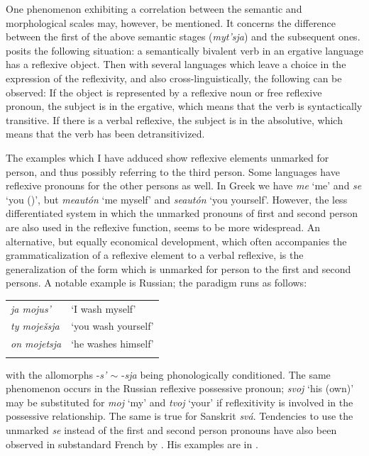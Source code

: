 One phenomenon exhibiting a correlation between the semantic and morphological scales may, however, be mentioned. It concerns the difference between the first of the above semantic stages (\textit{myt'sja}) and the subsequent ones. \citet[646f]{Edmondson1978} posits the following situation: a semantically bivalent verb in an ergative language has a reflexive object. Then with several languages which leave a choice in the expression of the reflexivity, and also cross-linguistically, the following can be observed: If the object is represented by a reflexive noun or free reflexive pronoun, the subject is in the ergative, which means that the verb is syntactically transitive. If there is a verbal reflexive, the subject is in the absolutive, which means that the verb has been detransitivized.

The examples which I have adduced show reflexive elements unmarked for person, and thus possibly referring to the third person. Some languages have reflexive pronouns for the other persons as well. In Greek we have \textit{me} ‘me’ and \textit{se} ‘you (\glacc)’, but \textit{meautón} ‘me myself’ and \textit{seautón} ‘you yourself’. However, the less differentiated system in which the unmarked pronouns of first and second person are also used in the reflexive function, seems to be more widespread. An alternative, but equally economical development, which often accompanies the grammaticalization of a reflexive element to a verbal reflexive, is the generalization of the form which is unmarked for person to the first and second persons. A notable example is Russian; the paradigm runs as follows:

\begin{table}
\begin{tabular}{ll}
\lsptoprule

\itshape ja mojus' & ‘I wash myself’\\
\itshape ty moješsja & ‘you wash yourself’\\
\itshape on mojetsja & ‘he washes himself’\\
\lspbottomrule
\end{tabular}
\end{table}

\noindent with the allomorphs -\textit{s' ${\sim}$} -\textit{sja} being phonologically conditioned. The same phenomenon occurs in the Russian reflexive possessive pronoun; \textit{svoj} ‘his (own)’ may be substituted for \textit{moj} ‘my’ and \textit{tvoj} ‘your’ if reflexitivity is involved in the possessive relationship. The same is true for Sanskrit \textit{svá}. Tendencies to use the unmarked \textit{se} instead of the first and second person pronouns have also been observed in substandard %
 French by \citet[147]{Frei1929}. His examples are in .


